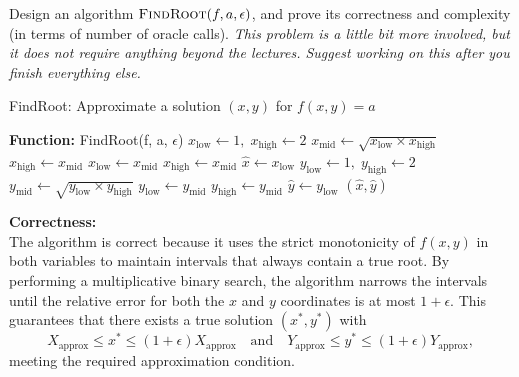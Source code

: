 \documentclass[letterpaper, 11pt]{article}
\newcommand{\1}{\mathds{1}}	%
\theoremstyle{definition}
\newenvironment{solution}{{\par\noindent\it Solution.}}{}
\begin{document}
Design an algorithm $\textsc{FindRoot}(f, a, \epsilon)$, and prove its correctness and complexity (in terms of number of oracle calls). \emph{This problem is a little bit more involved, but it does not require anything beyond the lectures. Suggest working on this after you finish everything else.}

\begin{solution}
    \begin{algorithm}[H]
        \caption{FindRoot: Approximate a solution $(x,y)$ for $f(x,y)=a$}
        \begin{algorithmic}[1]
            \STATE \textbf{Function:} FindRoot(f, a, $\epsilon$)
                 
            \ENDIF
            \STATE \(x_{\text{low}} \gets 1,\; x_{\text{high}}  \gets 2\)
                \STATE \(x_{\text{mid}}  \gets \sqrt{x_{\text{low}}  \times x_{\text{high}} }\)
                    \STATE \(x_{\text{high}} \gets x_{\text{mid}}  \)
                    \STATE \(x_{\text{low}}  \gets x_{\text{mid}}  \)
                \ELSE
                    \STATE \(x_{\text{high}}  \gets x_{\text{mid}}  \)
                \ENDIF
            \ENDWHILE
            \STATE \(\hat{x} \gets x_{\text{low}} \)
            \STATE \(y_{\text{low}} \gets 1,\; y_{\text{high}} \gets 2\)
                \STATE \(y_{\text{mid}} \gets \sqrt{y_{\text{low}} \times y_{\text{high}} }\)
                    \STATE \(y_{\text{low}}\gets y_{\text{mid}} \)
                \ELSE
                    \STATE \(y_{\text{high}}  \gets y_{\text{mid}} \)
                \ENDIF
            \ENDWHILE
            \STATE \(\hat{y} \gets y_{\text{low}}\)
            \RETURN \((\hat{x}, \hat{y})\)
        \end{algorithmic}
        \end{algorithm}
        \textbf{Correctness:} \\
The algorithm is correct because it uses the strict monotonicity of \( f(x,y) \) in both variables to maintain intervals that always contain a true root. By performing a multiplicative binary search, the algorithm narrows the intervals until the relative error for both the \( x \) and \( y \) coordinates is at most \( 1+\epsilon \). This guarantees that there exists a true solution \( (x^*, y^*) \) with
\[
X_{\text{approx}} \le x^* \le (1+\epsilon)X_{\text{approx}} \quad \text{and} \quad
Y_{\text{approx}} \le y^* \le (1+\epsilon)Y_{\text{approx}},
\]
meeting the required approximation condition.


\end{solution}
\end{document}
